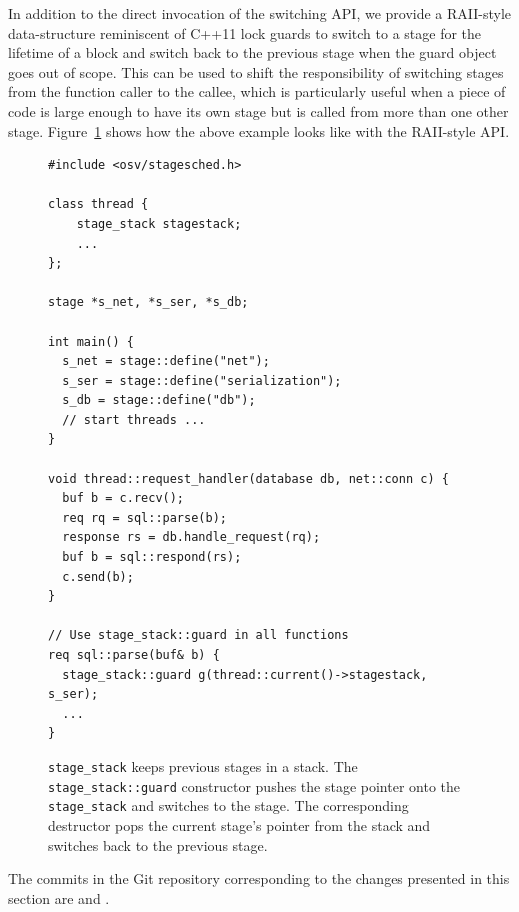 \documentclass[12pt,a4paper]{book}
\begin{document}
In addition to the direct invocation of the switching API, we provide a RAII-style data-structure reminiscent of C++11 lock guards to switch to a stage for the lifetime of a block and switch back to the previous stage when the guard object goes out of scope.
This can be used to shift the responsibility of switching stages from the function caller to the callee, which is particularly useful when a piece of code is large enough to have its own stage but is called from more than one other stage.
Figure~\ref{fig:di:api:examplestack} shows how the above example looks like with the RAII-style API.

\begin{figure}
\begin{lstlisting}[style=figurecpp,morekeywords={stage_stack,stage,stage::define,stage_stack::guard}]
#include <osv/stagesched.h>

class thread {
    stage_stack stagestack;
    ...
};

stage *s_net, *s_ser, *s_db;

int main() {
  s_net = stage::define("net");
  s_ser = stage::define("serialization");
  s_db = stage::define("db");
  // start threads ...
}

void thread::request_handler(database db, net::conn c) {
  buf b = c.recv();
  req rq = sql::parse(b);
  response rs = db.handle_request(rq);
  buf b = sql::respond(rs);
  c.send(b);
}

// Use stage_stack::guard in all functions
req sql::parse(buf& b) {
  stage_stack::guard g(thread::current()->stagestack, s_ser);
  ...
}

\end{lstlisting}
\caption{\lstinline[style=figurecpp]{stage_stack} keeps previous stages in a stack.
    The \lstinline[style=figurecpp]{stage_stack::guard} constructor pushes the stage pointer onto the \lstinline[style=figurecpp]{stage_stack} and switches to the stage.
    The corresponding destructor pops the current stage's pointer from the stack and switches back to the previous stage.}
\label{fig:di:api:examplestack}
\end{figure}

The commits in the Git repository corresponding to the changes presented in this section are  and .
\end{document}
